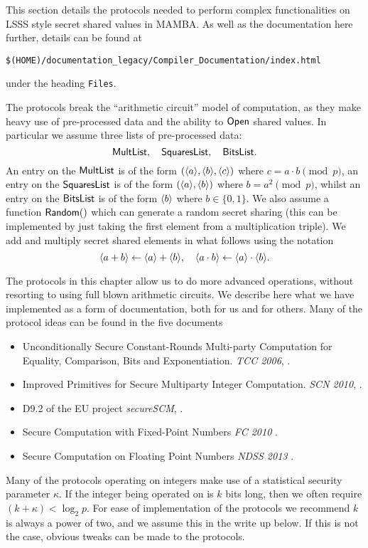 This section details the protocols needed to perform complex
functionalities on LSSS style secret shared values in MAMBA.
As well as the documentation here further, details can be
found at
\begin{center}
  \verb+$(HOME)/documentation_legacy/Compiler_Documentation/index.html+
\end{center}
under the heading \verb+Files+.

The protocols break the ``arithmetic circuit'' model of computation,
as they make heavy use of pre-processed data and the ability
to ${\mathsf{Open}}$ shared values.
In particular we assume three lists of pre-processed data:
\[ \mathsf{MultList}, \quad \mathsf{SquaresList}, \quad \mathsf{BitsList}. \]
An entry on the $\mathsf{MultList}$ is of the form
$(\langle a \rangle, \langle b \rangle, \langle c \rangle)$ where $c=a \cdot b \pmod{p}$,
an entry on the $\mathsf{SquaresList}$ is of the form
$(\langle a \rangle, \langle b \rangle)$ where $b=a^2 \pmod{p}$,
whilst an entry on the $\mathsf{BitsList}$ is of the form
$\langle b \rangle$ where $b \in \{0,1\}$.
We also assume a function $\mathsf{Random}()$ which can generate
a random secret sharing (this can be implemented by just taking
the first element from a multiplication triple).
We add and multiply secret shared elements in what follows
using the notation
\[ \langle a+b \rangle \leftarrow \langle a \rangle+\langle b \rangle, \quad
  \langle a\cdot b \rangle \leftarrow \langle a \rangle \cdot \langle b \rangle.
\]

The protocols in this chapter allow us to do more advanced operations,
without resorting to using full blown arithmetic circuits.
We describe here what we have implemented as a form of
documentation, both for us and for others.
Many of the protocol ideas can be found in the five
documents
\begin{itemize}
  \item Unconditionally Secure Constant-Rounds
        Multi-party Computation for Equality, Comparison, Bits and Exponentiation.
          {\em TCC 2006}, \cite{DFKNT06}.
  \item Improved Primitives for Secure Multiparty Integer Computation.
          {\em SCN 2010}, \cite{CH10}.
  \item D9.2 of the EU project {\em secureSCM}, \cite{SSCM}.
  \item Secure Computation with Fixed-Point Numbers {\em FC 2010} \cite{CS10}.
  \item Secure Computation on Floating Point Numbers {\em NDSS 2013} \cite{ABZS13}.
\end{itemize}
Many of the protocols operating on integers make use of a statistical security
parameter $\kappa$.
If the integer being operated on is $k$ bits long, then we often require $(k+\kappa)<\log_2 p$.
For ease of implementation of the protocols we recommend $k$ is
always a power of two, and we assume this in the write up below.
If this is not the case, obvious tweaks can be made to the protocols.


